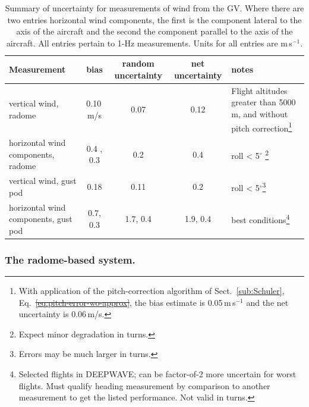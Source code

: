 \documentclass[12pt,twoside,english]{article}\usepackage[]{graphicx}\usepackage[]{color}
\providecommand{\tabularnewline}{\\}
\providecommand{\DIFadd}[1]{{\protect\color{blue}\uwave{#1}}} %
\providecommand{\DIFdel}[1]{{\protect\color{red}\sout{#1}}}                      %
\providecommand{\DIFaddbegin}{} %
\providecommand{\DIFaddend}{} %
\providecommand{\DIFaddFL}[1]{\DIFadd{#1}} %
\providecommand{\DIFdelFL}[1]{\DIFdel{#1}} %
\providecommand{\DIFaddbeginFL}{} %
\providecommand{\DIFaddendFL}{} %
\providecommand{\DIFdelbeginFL}{} %
\providecommand{\DIFdelendFL}{} %
\begin{document}
{{\begin{table}
\noindent \centering{}%
\begin{minipage}[t]{1\columnwidth}%
\protect\caption[Summary of uncertainty for measurements of wind from the GV.]{Summary of uncertainty for measurements of wind from the GV. Where there are two
entries horizontal wind components, the first is the component lateral
to the axis of the aircraft and the second the component parallel to the
axis of the aircraft. All entries pertain to 1-Hz measurements. Units for all entries are m\,s$^{-1}$.\label{tab:Summary-of-uncertainty}}


\noindent \begin{center}
\begin{tabular}{>{\centering}p{3cm}ccc>{\centering}p{2.5cm}}
\toprule 
\textbf{Measurement}  &
\textbf{bias}  &
\textbf{random uncertainty}  &
\textbf{net uncertainty}  &
\textbf{notes}\tabularnewline
\midrule
\midrule 
vertical wind, radome  &
0.10\,m/s  &
0.07  &
0.12  &
Flight altitudes greater than 5000 m, and without pitch correction\footnote{With application of the pitch-correction algorithm of Sect.~\ref{sub:Schuler},
Eq.~\DIFdelbeginFL \DIFdelFL{\ref{eq:pitch-error-wo-approx}}\DIFdelendFL \DIFaddbeginFL \DIFaddFL{\ref{eq:final-answer}}\DIFaddendFL , the bias estimate is 0.05\,m\,s$^{-1}$
and the net uncertainty is 0.06\,m/s.}\tabularnewline
\midrule 
horizontal wind components, radome  &
0.4 , 0.3  &
0.2  &
0.4  &
roll < 5$^{\circ}$ \footnote{Expect minor degradation in turns.}\tabularnewline
\midrule 
vertical wind, gust pod  &
0.18  &
0.11  &
0.2  &
roll < 5$^{\circ}$\footnote{Errors may be much larger in turns.}\tabularnewline
\midrule 
horizontal wind components, gust pod  &
0.7, 0.3  &
1.7, 0.4  &
1.9, 0.4  &
best conditions\footnote{Selected flights in DEEPWAVE; can be factor-of-2 more uncertain for
worst flights. Must qualify heading measurement by comparison to another
measurement to get the listed performance. Not valid in turns.}\tabularnewline
\bottomrule
\end{tabular}
\par\end{center}%
\end{minipage}
\end{table}



\subsubsection{The radome-based system.\DIFaddbegin \label{sub:conclusions-radome}\DIFaddend }

}}
\end{document}
